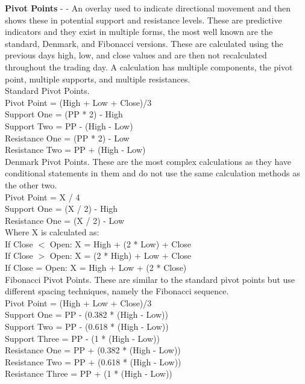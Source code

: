 \documentclass[conference]{IEEEtran}
\begin{document}

\noindent
\textbf{Pivot Points} - \cite{Murphy1999} - An overlay used to indicate directional movement and then shows these in potential support and resistance levels. These are predictive indicators and they exist in multiple forms, the most well known are the standard, Denmark, and Fibonacci versions. These are calculated using the previous days high, low, and close values and are then not recalculated throughout the trading day. A calculation has multiple components, the pivot point, multiple supports, and multiple resistances.\\

\noindent
Standard Pivot Points. \\
Pivot Point = (High + Low + Close)/3\\
Support One = (PP * 2) - High\\
Support Two = PP - (High - Low)\\
Resistance One = (PP * 2) - Low\\
Resistance Two = PP + (High - Low)\\

\noindent
Denmark Pivot Points. These are the most complex calculations as they have conditional statements in them and do not use the same calculation methods as the other two.\\
Pivot Point = X / 4\\
Support One = (X / 2) - High\\
Resistance One = (X / 2) - Low\\

\noindent
Where X is calculated as: \\
If Close $<$ Open: X = High + (2 * Low) + Close\\
If Close $>$ Open: X = (2 * High) + Low + Close\\
If Close = Open: X = High + Low + (2 * Close)\\

\noindent
Fibonacci Pivot Points. These are similar to the standard pivot points but use different spacing techniques, namely the Fibonacci sequence.\\
Pivot Point = (High + Low + Close)/3\\
Support One = PP - (0.382 * (High  -  Low))\\
Support Two = PP - (0.618 * (High  -  Low))\\
Support Three = PP - (1 * (High  -  Low))\\
Resistance One = PP + (0.382 * (High  -  Low))\\
Resistance Two = PP + (0.618 * (High  -  Low))\\
Resistance Three = PP + (1 * (High  -  Low))\\
\end{document}
